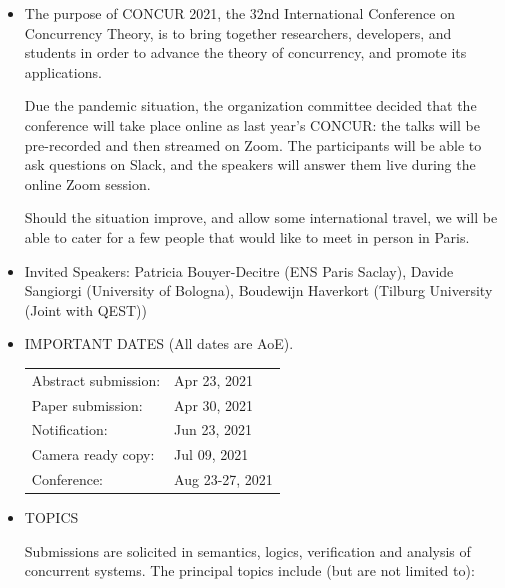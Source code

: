 \documentclass[prodmode,acmtecs]{acmsmall} %
\begin{document}
\begin{itemize}\item  The purpose of CONCUR 2021, the 32nd International Conference on Concurrency Theory, is to bring together researchers, developers, and students in order to advance the theory of concurrency, and promote its applications. 
 
  Due the pandemic situation, the organization committee decided that the conference will take place online as last year's CONCUR: the talks will be pre-recorded and then streamed on Zoom. The participants will be able to ask questions on Slack, and the speakers will answer them live during the online Zoom session. 
 
  Should the situation improve, and allow some international travel, we will be able to cater for a few people that would like to meet in person in Paris. 
 
\item  Invited Speakers: Patricia Bouyer-Decitre (ENS Paris Saclay), Davide Sangiorgi (University of Bologna), Boudewijn Haverkort (Tilburg University (Joint with QEST)) 
 
\item  IMPORTANT DATES (All dates are AoE). 
 
\begin{tabulary}{\linewidth}{LL}Abstract submission:  & Apr 23, 2021 \\
Paper submission:  & Apr 30, 2021 \\
Notification:  & Jun 23, 2021 \\
Camera ready copy:  & Jul 09, 2021 \\
Conference:  & Aug 23-27, 2021 \\
\end{tabulary}
 
\item  TOPICS 
 
  Submissions are solicited in semantics, logics, verification and analysis of concurrent systems. The principal topics include (but are not limited to):   
 

\end{itemize}
\end{document}
